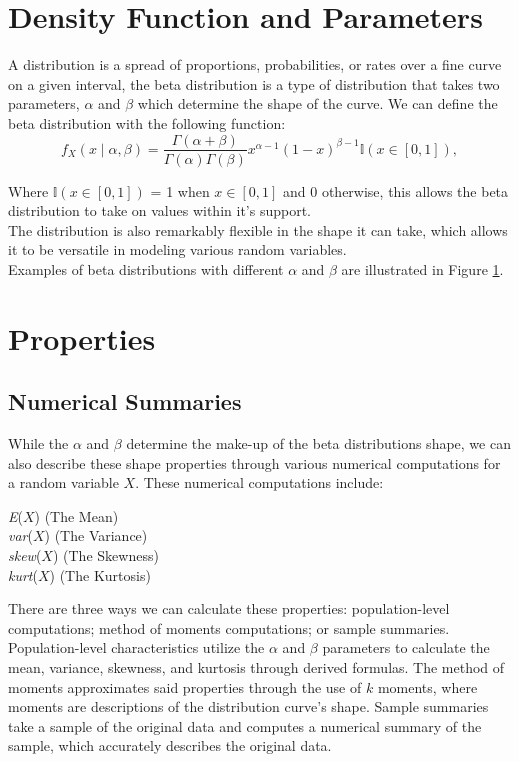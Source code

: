 \documentclass{article}\usepackage[]{graphicx}\usepackage[]{xcolor}
\begin{document}
\begin{multicols}{2}
\section{Density Function and Parameters}
A distribution is a spread of proportions, probabilities, or rates over a fine curve on a given interval, the beta distribution is a type of distribution that takes two parameters, $\alpha$ and $\beta$ which determine the shape of the curve. We can define the beta distribution with the following function:
\[
f_X(x \mid \alpha, \beta) = \frac{\Gamma(\alpha + \beta)}{\Gamma(\alpha) \Gamma(\beta)} x^{\alpha - 1} (1 - x)^{\beta - 1} \mathbb{I}(x \in [0,1]),
\]

Where $\mathbb{I}(x \in [0,1])$ = 1 when $x \in [0,1]$ and 0 otherwise, this allows the beta distribution to take on values within it's support. \\
The distribution is also remarkably flexible in the shape it can take, which allows it to be versatile in modeling various random variables. \\

Examples of beta distributions with different $\alpha$ and $\beta$ are illustrated in Figure \hyperref[fig1]{1}.

\section{Properties}
\subsection{Numerical Summaries}
While the $\alpha$ and $\beta$ determine the make-up of the beta distributions shape, we can also describe these shape properties through various numerical computations for a random variable $X$. These numerical computations include:
\begin{center}
\emph{E}($X$) (The Mean)\\
\emph{var}($X$)  (The Variance)\\
\emph{skew}($X$) (The Skewness)\\
\emph{kurt}($X$) (The Kurtosis)\\
\end{center}
There are three ways we can calculate these properties: population-level computations; method of moments computations; or sample summaries. \\
Population-level characteristics utilize the $\alpha$ and $\beta$ parameters to calculate the mean, variance, skewness, and kurtosis through derived formulas. The method of moments approximates said properties through the use of $k$ moments, where moments are descriptions of the distribution curve's shape. Sample summaries take a sample of the original data and computes a numerical summary of the sample, which accurately describes the original data. \\


\end{multicols}
\end{document}
